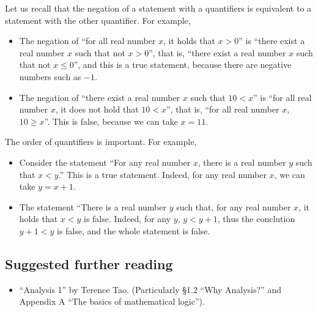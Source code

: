 Let us recall that the negation of a statement with a quantifiers is equivalent to a statement with the other quantifier.
For example,
\begin{itemize}
 \item The negation of ``for all real number $x$, it holds that $x > 0$''
 is ``there exist a real number $x$ such that not $x > 0$'',
 that is, ``there exist a real number $x$ such that not $x \le 0$'',
 and this is a true statement, because there are negative numbers such as $-1$.
 \item The negation of ``there exist a real number $x$ such that $10 < x$''
 is ``for all real number $x$, it does not hold that $10 < x$'',
 that is,  ``for all real number $x$, $10 \ge x$''. This is false, because we can take $x=11$.
\end{itemize}


The order of quantifiers is important. For example,
\begin{itemize}
 \item Consider the statement ``For any real number $x$, there is a real number $y$ such that $x < y$.''
 This is a true statement. Indeed, for any real number $x$, we can take $y = x + 1$.
 \item The statement ``There is a real number $y$ such that, for any real number $x$, it holds that $x < y$ is false.
 Indeed, for any $y$, $y < y+1$, thus the conclution $y+1 < y$ is false, and the whole statement is false.
\end{itemize}




\subsection*{Suggested further reading}

\begin{itemize}
  \item ``Analysis 1'' by Terence Tao.
        (Particularly \S 1.2 ``Why Analysis?'' and Appendix A ``The basics of mathematical logic'').
\end{itemize}

\bookletend%
